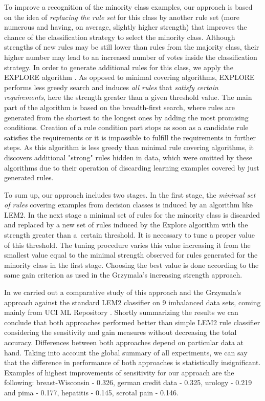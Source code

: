 \documentclass{AIMeth05}
\begin{document}
To improve a recognition of the minority class examples, our approach is
based on the idea of {\em replacing the rule set} for this class by another
rule set (more numerous and having, on average, slightly higher strength)
that improves the chance of the classification strategy to select the
minority class. Although strengths of new rules may be still lower than
rules from the majority class, their higher number may lead to an increased
number of votes inside the classification strategy. In order to generate
additional rules for this class, we apply the EXPLORE algorithm \cite{vdp}.
As opposed to minimal covering algorithms, EXPLORE performs less greedy
search and induces {\em all rules} that {\em satisfy certain requirements},
here the strength greater than a given threshold value. The main part of the
algorithm is based on the breadth-first search, where rules are generated
from the shortest to the longest ones by adding the most promising
conditions. Creation of a rule condition part stops as soon as a candidate
rule satisfies the requirements or it is impossible to fulfill the
requirements in further steps. As this algorithm is less greedy than minimal
rule covering algorithms, it discovers additional "strong" rules hidden in
data, which were omitted by these algorithms due to their operation of
discarding learning examples covered by just generated rules.

To sum up, our approach includes two stages. In the first stage, the {\em
minimal set of rules} covering examples from decision classes is induced by
an algorithm like LEM2.  In the next stage a minimal set of rules for the
minority class is discarded and replaced by a new set of rules induced by
the Explore algorithm with the strength greater than a~certain threshold. It
is necessary to tune a proper value of this threshold. The tuning procedure
varies this value increasing it from the smallest value equal to the minimal
strength observed for rules generated for the minority class in the first
stage. Choosing the best value is done according to the same gain criterion
as used in the Grzymala's increasing strength approach.

In \cite{GrzymJSW} we carried out a comparative study of this approach and
the Grzymala's approach against the standard LEM2 classifier on 9 imbalanced
data sets, coming mainly from UCI ML Repository \cite{irvine}. Shortly
summarizing the results we can conclude that both approaches performed
better than simple LEM2 rule classifier considering the sensitivity and gain
measures without decreasing the total accuracy. Differences between both
approaches depend on particular data at hand. Taking into account the global
summary of all experiments, we can say that the difference in performance of
both approaches is statistically insignificant. Examples of highest
improvements of sensitivity for our approach are the following:
breast-Wisconsin - 0.326, german credit data - 0.325, urology - 0.219 and
pima - 0.177, hepatitis - 0.145, scrotal pain - 0.146.
\end{document}
